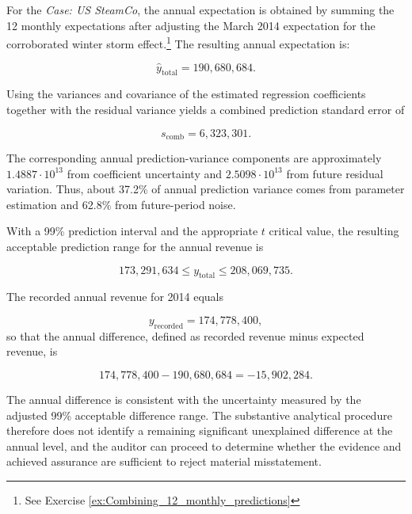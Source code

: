 \medskip
For the \emph{Case: US SteamCo}, the annual expectation is obtained by summing the 12 monthly expectations after adjusting the March 2014 expectation for the corroborated winter storm effect.\footnote{See Exercise \ref{ex:Combining_12_monthly_predictions}}
The resulting annual expectation is:

\begin{equation*}
\hat{y}_{\text{total}} = 190,680,684.
\end{equation*}

Using the variances and covariance of the estimated regression coefficients together with the residual variance yields a combined prediction standard error of

\begin{equation*}
s_{\text{comb}} = 6,323,301.
\end{equation*}

The corresponding annual prediction-variance components are approximately $1.4887 \cdot 10^{13}$ from coefficient uncertainty and $2.5098 \cdot 10^{13}$ from future residual variation. Thus, about 37.2\% of annual prediction variance comes from parameter estimation and 62.8\% from future-period noise.

With a 99\% prediction interval and the appropriate $t$ critical value, the resulting acceptable prediction range for the annual revenue is

\begin{equation*}
173,291,634
\le
y_{\text{total}}
\le
208,069,735.
\end{equation*}

The recorded annual revenue for 2014 equals

\begin{equation*}
y_{\text{recorded}} = 174,778,400,
\end{equation*}
so that the annual difference, defined as recorded revenue minus expected revenue, is

\begin{equation*}
174,778,400 - 190,680,684 = -15,902,284.
\end{equation*}

The annual difference is consistent with the uncertainty measured by the adjusted 99\% acceptable difference range. The substantive analytical procedure therefore does not identify a remaining significant unexplained difference at the annual level, and the auditor can proceed to determine whether the evidence and achieved assurance are sufficient to reject material misstatement.

